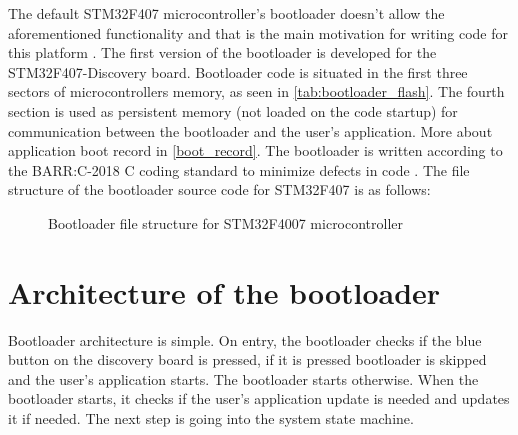 The default STM32F407 microcontroller's bootloader doesn't allow the aforementioned functionality and that is the main motivation for writing code for this platform \citep{stm32f407_ref_man}. The first version of the bootloader is developed for the STM32F407-Discovery board. Bootloader code is situated in the first three sectors of microcontrollers memory, as seen in \autoref{tab:bootloader_flash}. The fourth section is used as persistent memory (not loaded on the code startup) for communication between the bootloader and the user's application. More about application boot record in \autoref{boot_record}. The bootloader is written according to the BARR:C-2018 C coding standard to minimize defects in code \citep{barr_c}. The file structure of the bootloader source code for STM32F407 is as follows:
\begin{figure}[H]
\caption{Bootloader file structure for STM32F4007 microcontroller}
\label{tree:bootloader}
\end{figure}

\section{Architecture of the bootloader}

Bootloader architecture is simple. On entry, the bootloader checks if the blue button on the discovery board is pressed, if it is pressed bootloader is skipped and the user's application starts. The bootloader starts otherwise. When the bootloader starts, it checks if the user's application update is needed and updates it if needed. The next step is going into the system state machine.

